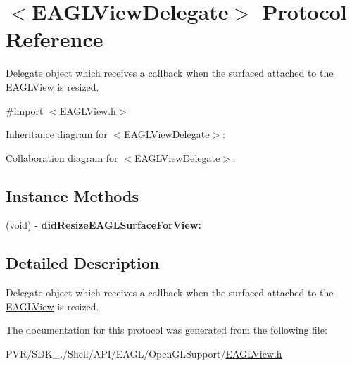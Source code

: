 \hypertarget{protocol_e_a_g_l_view_delegate-p}{\section{$<$E\+A\+G\+L\+View\+Delegate$>$ Protocol Reference}
\label{protocol_e_a_g_l_view_delegate-p}
}


Delegate object which receives a callback when the surfaced attached to the \hyperlink{interface_e_a_g_l_view}{E\+A\+G\+L\+View} is resized.  




{\ttfamily \#import $<$E\+A\+G\+L\+View.\+h$>$}



Inheritance diagram for $<$E\+A\+G\+L\+View\+Delegate$>$\+:


Collaboration diagram for $<$E\+A\+G\+L\+View\+Delegate$>$\+:
\subsection*{Instance Methods}
\begin{DoxyCompactItemize}
\item 
\hypertarget{protocol_e_a_g_l_view_delegate-p_a763247fb631c4cb6b7e420f99e007883}{(void) -\/ {\bfseries did\+Resize\+E\+A\+G\+L\+Surface\+For\+View\+:}}\label{protocol_e_a_g_l_view_delegate-p_a763247fb631c4cb6b7e420f99e007883}

\end{DoxyCompactItemize}


\subsection{Detailed Description}
Delegate object which receives a callback when the surfaced attached to the \hyperlink{interface_e_a_g_l_view}{E\+A\+G\+L\+View} is resized. 



 

The documentation for this protocol was generated from the following file\+:\begin{DoxyCompactItemize}
\item 
P\+V\+R/\+S\+D\+K\+\_./\+Shell/\+A\+P\+I/\+E\+A\+G\+L/\+Open\+G\+L\+Support/\hyperlink{_e_a_g_l_view_8h}{E\+A\+G\+L\+View.\+h}\end{DoxyCompactItemize}
